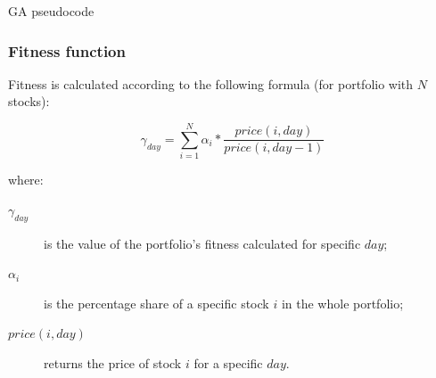 \begin{algorithm}
 
  \BlankLine
  \initialise{\population} \;
  
  \caption{GA pseudocode}\label{genetic_pseudo}
\end{algorithm}




\subsubsection{Fitness function}
\label{sec:gen_fitness_fun}

Fitness is calculated according to the following formula (for portfolio with $N$ stocks):

\begin{equation}
    \gamma_{day} =  \sum_{i=1}^{N} {  \alpha_{i} * \frac{price(i,day)}{price(i,day - 1)} }
\end{equation}

where:

\begin{description}
  \item [$\gamma_{day}$] 
      is the value of the portfolio's fitness calculated for specific $day$;
  \item [$\alpha_{i}$]
      is the percentage share of a specific stock $i$ in the whole portfolio;
  \item [$price(i,day)$]
      returns the price of stock $i$ for a specific $day$.
\end{description}

